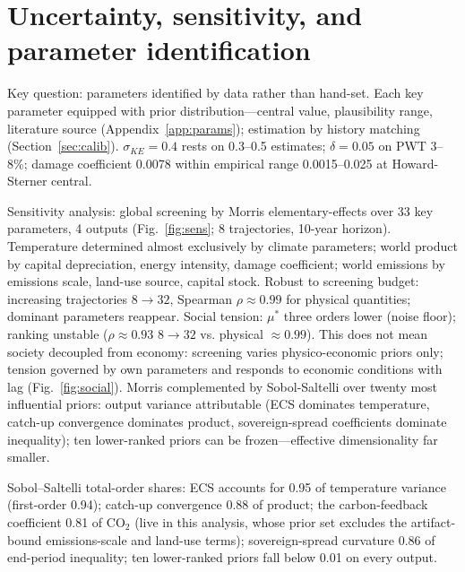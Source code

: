\documentclass[a4paper,fleqn]{cas-sc}
\begin{document}
\section{Uncertainty, sensitivity, and parameter identification}
\label{sec:uq}

Key question: parameters identified by data rather than hand-set. Each key parameter equipped with prior distribution---central value, plausibility range, literature source (Appendix~\ref{app:params}); estimation by history matching (Section~\ref{sec:calib}). $\sigma_{KE}=0.4$ rests on 0.3--0.5 estimates; $\delta=0.05$ on PWT 3--8\%; damage coefficient 0.0078 within empirical range 0.0015--0.025 at Howard-Sterner central.

Sensitivity analysis: global screening by Morris elementary-effects \citep{morris1991,campolongo2007} over 33 key parameters, 4 outputs (Fig.~\ref{fig:sens}; 8 trajectories, 10-year horizon). Temperature determined almost exclusively by climate parameters; world product by capital depreciation, energy intensity, damage coefficient; world emissions by emissions scale, land-use source, capital stock. Robust to screening budget: increasing trajectories $8\rightarrow 32$, Spearman $\rho\approx0.99$ for physical quantities; dominant parameters reappear. Social tension: $\mu^*$ three orders lower (noise floor); ranking unstable ($\rho\approx0.93$ $8\rightarrow 32$ vs. physical $\approx 0.99$). This does not mean society decoupled from economy: screening varies physico-economic priors only; tension governed by own parameters and responds to economic conditions with lag (Fig.~\ref{fig:social}). Morris complemented by Sobol-Saltelli over twenty most influential priors: output variance attributable (ECS dominates temperature, catch-up convergence dominates product, sovereign-spread coefficients dominate inequality); ten lower-ranked priors can be frozen---effective dimensionality far smaller.

Sobol--Saltelli total-order shares: ECS accounts for 0.95 of temperature variance (first-order 0.94); catch-up convergence 0.88 of product; the carbon-feedback coefficient 0.81 of CO$_2$ (live in this analysis, whose prior set excludes the artifact-bound emissions-scale and land-use terms); sovereign-spread curvature 0.86 of end-period inequality; ten lower-ranked priors fall below 0.01 on every output.
\end{document}
